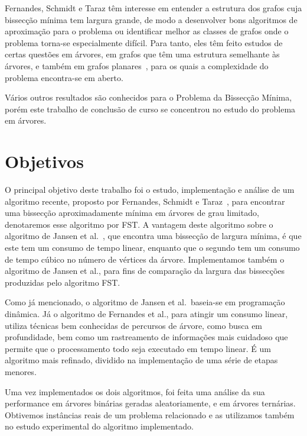 \documentclass[a4paper,12pt]{article}
\begin{document}
Fernandes, Schmidt e Taraz têm interesse em entender a estrutura 
dos grafos cuja bissecção mínima tem largura grande, de modo a 
desenvolver bons algoritmos de aproximação para o problema ou 
identificar melhor as classes de grafos onde o problema torna-se 
especialmente difícil. 
Para tanto, eles têm feito estudos de certas questões em árvores, 
em grafos que têm uma estrutura semelhante às árvores, e também em 
grafos planares~\cite{FernandesST13,FernandesST15}, para os quais 
a complexidade do problema encontra-se em aberto. 

Vários outros resultados são conhecidos para o Problema da 
Bissecção Mínima, porém este trabalho de conclusão de curso se 
concentrou no estudo do problema em árvores.

\newpage



\section{Objetivos} 

O principal objetivo deste trabalho foi o estudo, implementação e 
análise de um algoritmo recente, proposto por Fernandes, Schmidt e 
Taraz~\cite{FernandesST13}, para encontrar uma bissecção 
aproximadamente mínima em árvores de grau limitado, denotaremos
esse algoritmo por FST. 
A vantagem deste algoritmo sobre o algoritmo de Jansen et 
al.~\cite{JansenKLS01}, que encontra uma bissecção de largura 
mínima, é que este tem um consumo de tempo linear, enquanto que o 
segundo tem um consumo de tempo cúbico no número de vértices da 
árvore. 
Implementamos também o algoritmo de Jansen et al., para fins de 
comparação da largura das bissecções produzidas pelo algoritmo
FST. 

Como já mencionado, o algoritmo de Jansen et al.\ baseia-se em 
programação dinâmica. 
Já o algoritmo de Fernandes et al., para atingir um consumo 
linear, utiliza técnicas bem conhecidas de percursos de árvore, 
como busca em profundidade, bem como um rastreamento de 
informações mais cuidadoso que permite que o processamento todo 
seja executado em tempo linear. 
É um algoritmo mais refinado, dividido na implementação de uma 
série de etapas menores. 

Uma vez implementados os dois algoritmos, foi feita uma análise 
da sua performance em árvores binárias geradas aleatoriamente, e 
em árvores ternárias.
Obtivemos instâncias reais de um problema relacionado e as 
utilizamos também no estudo experimental do algoritmo implementado.
 
\end{document}
